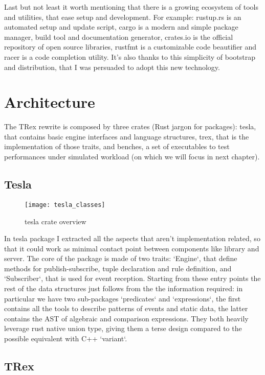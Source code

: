 Last but not least it worth mentioning that there is a growing ecosystem of tools and utilities, that ease setup and development. For example: rustup.rs is an automated setup and update script, cargo is a modern and simple package manager, build tool and documentation generator, crates.io is the official repository of open source libraries, rustfmt is a customizable code beautifier and racer is a code completion utility. It's also thanks to this simplicity of bootstrap and distribution, that I was persuaded to adopt this new technology.

\section{Architecture}
The TRex rewrite is composed by three crates (Rust jargon for packages): tesla, that contains basic engine interfaces and language structures, trex, that is the implementation of those traits, and benches,  a set of executables to test performances under simulated workload (on which we will focus in next chapter).

\subsection{Tesla}

\begin{figure}[h]
  \centering
  \texttt{[image: tesla\_classes]}
  \caption{tesla crate overview}
\end{figure}

In tesla package I extracted all the aspects that aren't implementation related, so that it could work as minimal contact point between components like library and server. The core of the package is made of two traits: `Engine`, that define methods for publish-subscribe, tuple declaration and rule definition, and `Subscriber`, that is used for event reception. Starting from these entry points the rest of the data structures just follows from the the information required: in particular we have two sub-packages `predicates` and `expressions`, the first contains all the tools to describe patterns of events and static data, the latter contains the AST of algebraic and comparison expressions. They both heavily leverage rust native union type, giving them a terse design compared to the possible equivalent with C++ `variant`.

\subsection{TRex}

